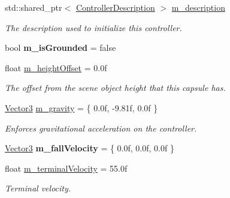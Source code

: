 \begin{Indent}
\begin{DoxyCompactItemize}
std\+::shared\+\_\+ptr$<$ \mbox{\hyperlink{classrev_1_1_controller_description}{Controller\+Description}} $>$ \mbox{\hyperlink{classrev_1_1_character_controller_a3cd59b576eb1ff95ddb1e75e95c3e722}{m\+\_\+description}}
\begin{DoxyCompactList}\small\item\em The description used to initialize this controller. \end{DoxyCompactList}\item 
\mbox{\label{classrev_1_1_character_controller_ab3502593a9cecc1c1ed02713bf25f309}} 
bool {\bfseries m\+\_\+is\+Grounded} = false
\item 
\mbox{\label{classrev_1_1_character_controller_a7cf376066e33abd31d8d65ee88a6a597}} 
float \mbox{\hyperlink{classrev_1_1_character_controller_a7cf376066e33abd31d8d65ee88a6a597}{m\+\_\+height\+Offset}} = 0.\+0f
\begin{DoxyCompactList}\small\item\em The offset from the scene object height that this capsule has. \end{DoxyCompactList}\item 
\mbox{\label{classrev_1_1_character_controller_a3ec36cc06f258f999b65da51ac6fe3a6}} 
\mbox{\hyperlink{classrev_1_1_vector}{Vector3}} \mbox{\hyperlink{classrev_1_1_character_controller_a3ec36cc06f258f999b65da51ac6fe3a6}{m\+\_\+gravity}} = \{ 0.\+0f, -\/9.\+81f, 0.\+0f \}
\begin{DoxyCompactList}\small\item\em Enforces gravitational acceleration on the controller. \end{DoxyCompactList}\item 
\mbox{\label{classrev_1_1_character_controller_ae67e67ad02f33df7de540e94b6dff168}} 
\mbox{\hyperlink{classrev_1_1_vector}{Vector3}} {\bfseries m\+\_\+fall\+Velocity} = \{ 0.\+0f, 0.\+0f, 0.\+0f \}
\item 
\mbox{\label{classrev_1_1_character_controller_a7f46b95703042bb3d08279093e1abdfc}} 
float \mbox{\hyperlink{classrev_1_1_character_controller_a7f46b95703042bb3d08279093e1abdfc}{m\+\_\+terminal\+Velocity}} = 55.\+0f
\begin{DoxyCompactList}\small\item\em Terminal velocity. \end{DoxyCompactList}\end{DoxyCompactItemize}
\end{Indent}
